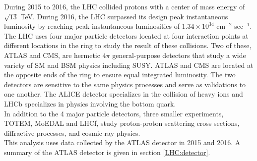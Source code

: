 \indent During 2015 to 2016, the LHC collided protons with a center of mass energy of $\sqrt{13}$ TeV.  During 2016, the LHC surpassed its design peak instantaneous luminosity by reaching peak instantaneous luminosities of $1.34 \times 10^{34}$ cm$^{-2}$ sec$^{-1}$.  \\

\indent The LHC uses four major particle detectors located at four interaction points at different locations in the ring to study the result of these collisions.  Two of these, ATLAS and CMS, are hermetic  $4\pi$ general-purpose detectors that study a wide variety of SM and BSM physics including SUSY.   ATLAS and CMS are located at the opposite ends of the ring to ensure equal integrated luminosity.  The two detectors are sensitive to the same physics processes and serve as validations to one another.  The ALICE detector specializes in the collision of heavy ions and LHCb specializes in physics involving the bottom quark. \\

\indent In addition to the 4 major particle detectors, three smaller experiments, TOTEM, MoEDAL and LHCf, study proton-proton scattering cross sections, diffractive processes, and cosmic ray physics.  ~\\

\indent This analysis uses data collected by the ATLAS detector in 2015 and 2016.  A summary of the ATLAS detector is given in section \ref{LHC:detector}. \\




